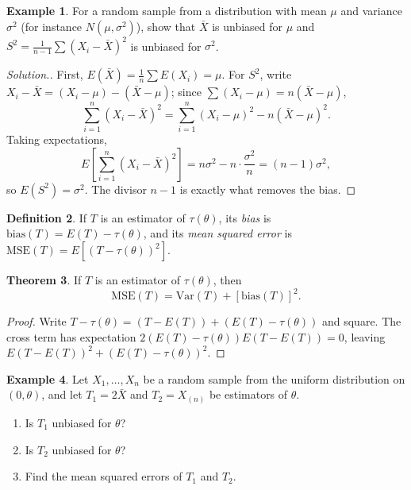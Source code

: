 \documentclass[12pt,a4paper]{report}
\theoremstyle{definition}
\newtheorem{thm}{Theorem}[section]
\newtheorem{definition}[thm]{Definition}
\newtheorem{example}[thm]{Example}
\theoremstyle{plain}
\newenvironment{solution}
  {\renewcommand{\qedsymbol}{}\begin{proof}[\textit{Solution}.]}
  {\end{proof}}
\begin{document}
\begin{example}
\label{ex:unbiasednormal}
For a random sample from a distribution with mean $\mu$ and variance $\sigma^2$
(for instance $N(\mu, \sigma^2)$), show that $\bar{X}$ is unbiased for $\mu$ and
$S^2 = \frac{1}{n - 1}\sum(X_i - \bar X)^2$ is unbiased for $\sigma^2$.
\end{example}

\begin{solution}
First, $E(\bar{X}) = \frac{1}{n}\sum E(X_i) = \mu$. For $S^2$, write
$X_i - \bar X = (X_i - \mu) - (\bar X - \mu)$; since
$\sum(X_i - \mu) = n(\bar X - \mu)$,
\[\sum^n_{i = 1}(X_i - \bar{X})^2 = \sum^n_{i = 1}(X_i - \mu)^2 - n(\bar{X} -
\mu)^2 .\]
Taking expectations,
\[E\left[\sum^n_{i = 1}(X_i - \bar{X})^2\right] = n\sigma^2 - n\cdot
\frac{\sigma^2}{n} = (n - 1)\sigma^2 ,\]
so $E(S^2) = \sigma^2$. The divisor $n - 1$ is exactly what removes the bias.
\end{solution}

\begin{definition}
\label{def:mse}
If $T$ is an estimator of $\tau(\theta)$, its \emph{bias} is
$\text{bias}(T) = E(T) - \tau(\theta)$, and its \emph{mean squared error} is
$\text{MSE}(T) = E\left[(T - \tau(\theta))^2\right]$.
\end{definition}

\begin{thm}
\label{thm:mse}
If $T$ is an estimator of $\tau(\theta)$, then
\[\text{MSE}(T) = \text{Var}(T) + \left[\text{bias}(T)\right]^2 .\]
\end{thm}

\begin{proof}
Write $T - \tau(\theta) = (T - E(T)) + (E(T) - \tau(\theta))$ and
square. The cross term has expectation
$2(E(T) - \tau(\theta))E(T - E(T)) = 0$, leaving
$E(T - E(T))^2 + (E(T) - \tau(\theta))^2$.
\end{proof}

\begin{example}
\label{ex:mseuniform}
Let $X_1, \dots , X_n$ be a random sample from the uniform distribution on
$(0,\theta)$, and let $T_1 = 2\bar{X}$ and $T_2 = X_{(n)}$ be estimators of
$\theta$.
\begin{enumerate}
\item[(a)] Is $T_1$ unbiased for $\theta$?
\item[(b)] Is $T_2$ unbiased for $\theta$?
\item[(c)] Find the mean squared errors of $T_1$ and $T_2$.
\end{enumerate}
\end{example}
\end{document}
